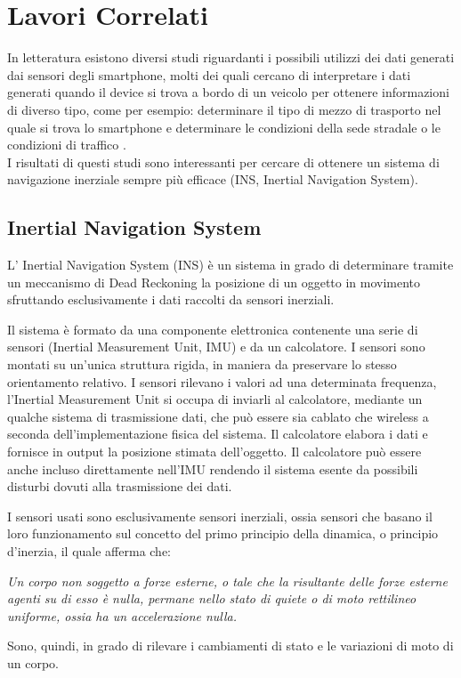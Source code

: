 \documentclass[12pt,a4paper,openright,twoside]{report}
\begin{document}
\clearpage{\pagestyle{empty}\cleardoublepage}
\chapter{Lavori Correlati}                %
\lhead[\fancyplain{}{\bfseries\thepage}]{\fancyplain{}{\bfseries\rightmark}}
In letteratura esistono diversi studi riguardanti i possibili utilizzi dei dati generati dai sensori degli smartphone, molti dei quali cercano di interpretare i dati generati quando il device si trova a bordo di un veicolo per ottenere informazioni di diverso tipo, come per esempio: determinare il tipo di mezzo di trasporto nel quale si trova lo smartphone \cite{K2, K3, K4, K5} e determinare le condizioni della sede stradale o le condizioni di traffico \cite{K6, K7}. \\

I risultati di questi studi sono interessanti per cercare di ottenere un sistema di navigazione inerziale sempre più efficace (INS, Inertial Navigation System).

\section{Inertial Navigation System}
L' Inertial Navigation System (INS) è un sistema in grado di determinare tramite un meccanismo di Dead Reckoning la posizione di un oggetto in movimento sfruttando esclusivamente i dati raccolti da sensori inerziali.


Il sistema è formato da una componente elettronica contenente una serie di sensori (Inertial Measurement Unit, IMU) e da un calcolatore. 
I sensori sono montati su un'unica struttura rigida, in maniera da preservare lo stesso orientamento relativo. I sensori rilevano i valori ad una determinata frequenza, l'Inertial Measurement Unit si occupa di inviarli al calcolatore, mediante un qualche sistema di trasmissione dati, che può essere sia cablato che wireless a seconda dell'implementazione fisica del sistema. Il calcolatore elabora i dati e fornisce in output la posizione stimata dell'oggetto. Il calcolatore può essere anche incluso direttamente nell'IMU rendendo il sistema esente da possibili disturbi dovuti alla trasmissione dei dati.

I sensori usati sono esclusivamente sensori inerziali, ossia sensori che basano il loro funzionamento sul concetto del primo principio della dinamica, o principio d'inerzia, il quale afferma che:
\begin{center}
\emph{Un corpo non soggetto a forze esterne, o tale che la risultante delle forze esterne agenti su di esso è nulla, permane nello stato di quiete o di moto rettilineo uniforme, ossia ha un accelerazione nulla.}
\end{center}
Sono, quindi, in grado di rilevare i cambiamenti di stato e le variazioni di moto di un corpo.
\end{document}
